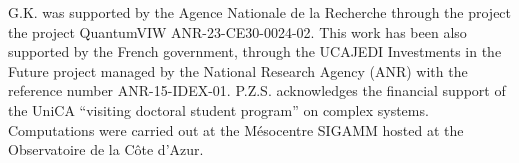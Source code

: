 \documentclass[%
 reprint,
 amsmath,amssymb,
 aps,
 prl,
]{revtex4-2}
\begin{document}
{\begin{acknowledgments}
    G.K. was supported by the Agence Nationale de la Recherche through the project the project QuantumVIW ANR-23-CE30-0024-02.
    This work has been also supported by the French government, through the UCAJEDI Investments in the Future project managed by the National Research Agency (ANR) with the reference number ANR-15-IDEX-01. P.Z.S. acknowledges the financial support of the UniCA ``visiting doctoral student program'' on complex systems. Computations were carried out at the Mésocentre SIGAMM hosted at the Observatoire de la Côte d’Azur.

  \end{acknowledgments}



\begin{thebibliography}{61}%
    \makeatletter
    \providecommand \@ifxundefined [1]{%
     \@ifx{#1\undefined}
    }%
    \providecommand \@ifnum [1]{%
     \ifnum #1\expandafter \@firstoftwo
     \else \expandafter \@secondoftwo
     \fi
    }%
    \providecommand \@ifx [1]{%
     \ifx #1\expandafter \@firstoftwo
     \else \expandafter \@secondoftwo
     \fi
    }%
    \providecommand \natexlab [1]{#1}%
    \providecommand \enquote  [1]{``#1''}%
    \providecommand \bibnamefont  [1]{#1}%
    \providecommand \bibfnamefont [1]{#1}%
    \providecommand \citenamefont [1]{#1}%
    \providecommand \href@noop [0]{\@secondoftwo}%
    \providecommand \href [0]{\begingroup \@sanitize@url \@href}%
    \providecommand \@href[1]{\@@startlink{#1}\@@href}%
    \providecommand \@@href[1]{\endgroup#1\@@endlink}%
    \providecommand \@sanitize@url [0]{\catcode `\\12\catcode `\$12\catcode
      `\&12\catcode `\#12\catcode `\^12\catcode `\_12\catcode `\%12\relax}%
    \providecommand \@@startlink[1]{}%
    \providecommand \@@endlink[0]{}%
    \providecommand \url  [0]{\begingroup\@sanitize@url \@url }%
    \providecommand \@url [1]{\endgroup\@href {#1}{\urlprefix }}%
    \providecommand \urlprefix  [0]{URL }%
    \providecommand \Eprint [0]{\href }%
    \providecommand \doibase [0]{https://doi.org/}%
    \providecommand \selectlanguage [0]{\@gobble}%

\end{thebibliography}}
\end{document}
